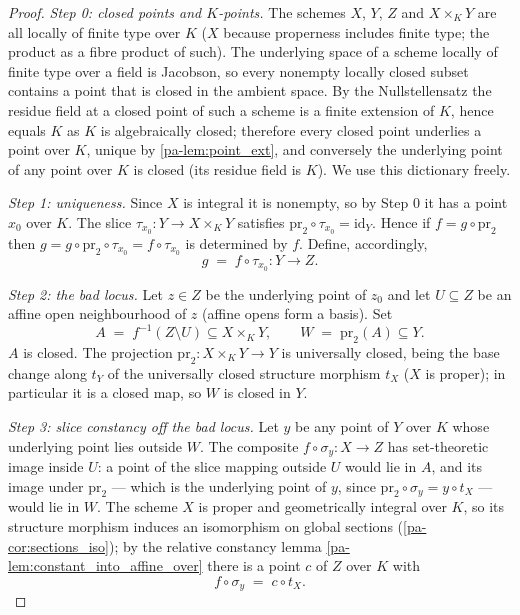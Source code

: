 \begin{proof}
  \leanok
  \emph{Step 0: closed points and \(K\)-points.} The schemes \(X\), \(Y\), \(Z\) and
  \(X \times_K Y\) are all locally of finite type over \(K\) (\(X\) because properness
  includes finite type; the product as a fibre product of such). The underlying space of a
  scheme locally of finite type over a field is Jacobson, so every nonempty locally closed
  subset contains a point that is closed in the ambient space. By the Nullstellensatz the
  residue field at a closed point of such a scheme is a finite extension of \(K\), hence
  equals \(K\) as \(K\) is algebraically closed; therefore every closed point underlies a
  point over \(K\), unique by \ref{pa-lem:point_ext}, and conversely the underlying point of
  any point over \(K\) is closed (its residue field is \(K\)). We use this dictionary
  freely.

  \emph{Step 1: uniqueness.} Since \(X\) is integral it is nonempty, so by Step 0 it has a
  point \(x_0\) over \(K\). The slice \(\tau_{x_0} : Y \to X \times_K Y\) satisfies
  \(\mathrm{pr}_2 \circ \tau_{x_0} = \mathrm{id}_Y\). Hence if \(f = g \circ \mathrm{pr}_2\)
  then \(g = g \circ \mathrm{pr}_2 \circ \tau_{x_0} = f \circ \tau_{x_0}\) is determined by
  \(f\). Define, accordingly,
  \[
    g \;=\; f \circ \tau_{x_0} : Y \longrightarrow Z .
  \]

  \emph{Step 2: the bad locus.} Let \(z \in Z\) be the underlying point of \(z_0\) and let
  \(U \subseteq Z\) be an affine open neighbourhood of \(z\) (affine opens form a basis).
  Set
  \[
    A \;=\; f^{-1}(Z \setminus U) \subseteq X \times_K Y,
    \qquad
    W \;=\; \mathrm{pr}_2(A) \subseteq Y .
  \]
  \(A\) is closed. The projection \(\mathrm{pr}_2 : X \times_K Y \to Y\) is universally
  closed, being the base change along \(t_Y\) of the universally closed structure morphism
  \(t_X\) (\(X\) is proper); in particular it is a closed map, so \(W\) is closed in \(Y\).

  \emph{Step 3: slice constancy off the bad locus.} Let \(y\) be any point of \(Y\) over
  \(K\) whose underlying point lies outside \(W\). The composite
  \(f \circ \sigma_y : X \to Z\) has set-theoretic image inside \(U\): a point of the slice
  mapping outside \(U\) would lie in \(A\), and its image under \(\mathrm{pr}_2\) — which is
  the underlying point of \(y\), since \(\mathrm{pr}_2 \circ \sigma_y = y \circ t_X\) — would
  lie in \(W\). The scheme \(X\) is proper and geometrically integral over \(K\), so its
  structure morphism induces an isomorphism on global sections
  (\ref{pa-cor:sections_iso}); by the relative constancy lemma
  \ref{pa-lem:constant_into_affine_over} there is a point \(c\) of \(Z\) over \(K\) with
  \[
    f \circ \sigma_y \;=\; c \circ t_X .
  \]


\end{proof}
